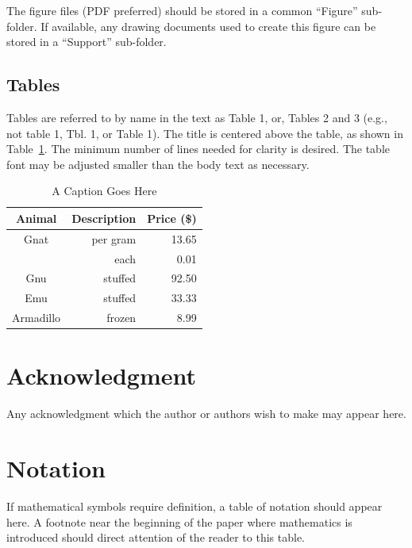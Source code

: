 \documentclass[]{LASPReportMemo}
\begin{document}
The figure files (PDF preferred) should be stored in a common ``Figure'' sub-folder.  If available, any drawing documents used to create this figure can be stored in a ``Support'' sub-folder.



\subsection{Tables}
Tables are referred to by name in the text as Table 1, or, Tables 2 and 3 (e.g., not table 1, Tbl. 1, or Table 1). The title is centered above the table, as shown in Table~\ref{tab:label}. The minimum number of lines needed for clarity is desired. The table font may be adjusted smaller than the body text as necessary.

\begin{table}[htbp]
    \caption{A Caption Goes Here}
   \label{tab:label}
        \centering \fontsize{10}{10}\selectfont
   \begin{tabular}{c | r | r } %
      \hline 
      Animal    & Description & Price (\$)\\
      \hline 
      Gnat      & per gram & 13.65 \\
                & each     &  0.01 \\
      Gnu       & stuffed  & 92.50 \\
      Emu       & stuffed  & 33.33 \\
      Armadillo & frozen   &  8.99 \\
      \hline
   \end{tabular}
\end{table}



\section{Acknowledgment}
Any acknowledgment which the author or authors wish to make may appear here. 



\section{Notation}
If mathematical symbols require definition, a table of notation should appear here. A footnote near the beginning of the paper where mathematics is introduced should direct attention of the reader to this table.
\end{document}
